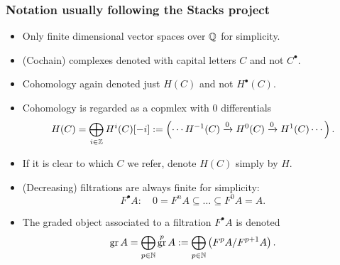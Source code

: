 \documentclass[notheorems, hyperref={backref}]{beamer}
\theoremstyle{darkgreentheorem}
\theoremstyle{darkbluedefinition}
\theoremstyle{darkredexample}
\theoremstyle{remark}
\DeclareMathOperator{\gr}{gr}
\begin{document}
\begin{frame}
    \frametitle{Notation usually following the Stacks project \cite{stacks}}
	\begin{itemize}
	    \item Only finite dimensional vector spaces over $\mathbb{Q}$ for simplicity.
		\pause
	    \item (Cochain) complexes denoted with capital letters $C$ and not $C^{\bullet}$.
		\pause
	    \item Cohomology again denoted just $H(C)$ and not $H^{\bullet}(C)$.
		\pause
	    \item Cohomology is regarded as a copmlex with $0$ differentials
		\[ H(C)=\bigoplus_{i\in \mathbb{Z}}H^{i}(C)[-i]:=\left(\cdots H^{-1}(C)\xrightarrow{0} H^{0}(C)\xrightarrow{0}H^{1}(C) \cdots \right). \]
		\pause
	    \item If it is clear to which $C$ we refer, denote $H(C)$ simply by $H$.
		\pause
	    \item (Decreasing) filtrations are always finite for simplicity:
		\[ F^{\bullet}A \colon \quad 0=F^{n}A\subseteq \ldots \subseteq F^{0}A=A. \]
		\pause
	    \item The graded object associated to a filtration $F^{\bullet}A$ is denoted
		\[ \gr{A}=\bigoplus_{p\in \N} \gr^{p}A:=\bigoplus_{p\in \N}\left( F^{p}A/F^{p+1}A \right). \]
	\end{itemize}
\end{frame}
\end{document}
